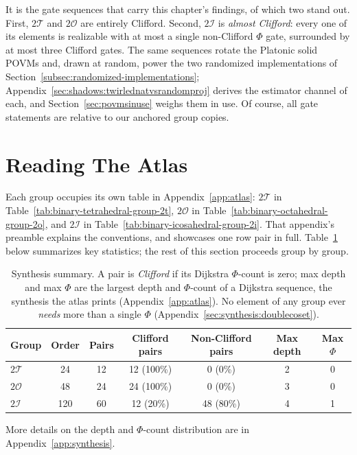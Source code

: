 \documentclass[11pt, oneside, openany]{scrbook}
\newcommand{\Tgroup}{\mathcal{T}}  %
\newcommand{\Ogroup}{\mathcal{O}}  %
\newcommand{\Igroup}{\mathcal{I}}  %
\newcommand{\TwoT}{2\Tgroup}
\newcommand{\TwoO}{2\Ogroup}
\newcommand{\TwoI}{2\Igroup}
\begin{document}
It is the gate sequences that carry this chapter's findings, of which two stand out. First, $\TwoT$ and $\TwoO$ are entirely Clifford. Second, $\TwoI$ is \textit{almost Clifford}: every one of its elements is realizable with at most a single non-Clifford $\Phi$ gate, surrounded by at most three Clifford gates. The same sequences rotate the Platonic solid POVMs and, drawn at random, power the two randomized implementations of Section~\ref{subsec:randomized-implementations}; Appendix~\ref{sec:shadows:twirlednatvsrandomproj} derives the estimator channel of each, and Section~\ref{sec:povmsinuse} weighs them in use. Of course, all gate statements are relative to our anchored group copies.

\section{Reading The Atlas} \label{sec:reading-atlas}

Each group occupies its own table in Appendix~\ref{app:atlas}: $\TwoT$ in Table~\ref{tab:binary-tetrahedral-group-2t}, $\TwoO$ in Table~\ref{tab:binary-octahedral-group-2o}, and $\TwoI$ in Table~\ref{tab:binary-icosahedral-group-2i}. That appendix's preamble explains the conventions, and showcases one row pair in full. Table~\ref{tab:synthesis-summary} below summarizes key statistics; the rest of this section proceeds group by group.

\begin{table}[h]
\centering
\begin{tabular}{l c c c c c c}
\toprule
Group & Order & Pairs & Clifford pairs & Non-Clifford pairs & Max depth & Max $\Phi$ \\
\midrule
$\TwoT$ & 24  & 12 & 12 (100\%) & 0 (0\%)   & 2 & 0 \\
$\TwoO$ & 48  & 24 & 24 (100\%) & 0 (0\%)   & 3 & 0 \\
$\TwoI$ & 120 & 60 & 12 (20\%)  & 48 (80\%) & 4 & 1 \\
\bottomrule
\end{tabular}
\caption{Synthesis summary. A pair is \textit{Clifford} if its Dijkstra $\Phi$-count is zero; max depth and max $\Phi$ are the largest depth and $\Phi$-count of a Dijkstra sequence, the synthesis the atlas prints (Appendix~\ref{app:atlas}). No element of any group ever \textit{needs} more than a single $\Phi$ (Appendix~\ref{sec:synthesis:doublecoset}).}
\label{tab:synthesis-summary}
\end{table}

More details on the depth and $\Phi$-count distribution are in Appendix~\ref{app:synthesis}.
\end{document}
